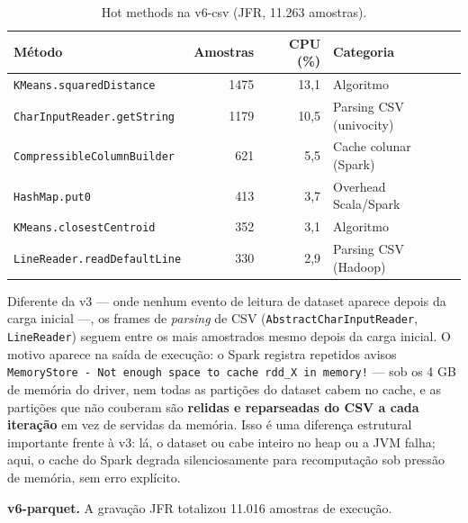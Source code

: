 \begin{table}[H]
\centering
\small
\begin{tabular}{p{7.4cm}rrp{3cm}}
\hline
\textbf{Método} & \textbf{Amostras} & \textbf{CPU (\%)} & \textbf{Categoria} \\
\hline
\texttt{KMeans.squaredDistance}       & 1475 & 13{,}1 & Algoritmo \\
\texttt{CharInputReader.getString}    & 1179 & 10{,}5 & Parsing CSV (univocity) \\
\texttt{CompressibleColumnBuilder}    &  621 &  5{,}5 & Cache colunar (Spark) \\
\texttt{HashMap.put0}                 &  413 &  3{,}7 & Overhead Scala/Spark \\
\texttt{KMeans.closestCentroid}       &  352 &  3{,}1 & Algoritmo \\
\texttt{LineReader.readDefaultLine}   &  330 &  2{,}9 & Parsing CSV (Hadoop) \\
\hline
\end{tabular}
\caption{Hot methods na v6-csv (JFR, 11.263 amostras).}
\label{tab:jfr-hot-v6-csv}
\end{table}

Diferente da v3 --- onde nenhum evento de leitura de dataset aparece
depois da carga inicial ---, os frames de \textit{parsing} de CSV
(\texttt{AbstractCharInputReader}, \texttt{LineReader}) seguem entre os
mais amostrados mesmo depois da carga inicial. O motivo aparece na saída
de execução: o Spark registra repetidos avisos
\texttt{MemoryStore - Not enough space to cache rdd\_X in memory!} ---
sob os 4 GB de memória do driver, nem todas as partições do dataset
cabem no cache, e as partições que não couberam são \textbf{relidas e
reparseadas do CSV a cada iteração} em vez de servidas da memória. Isso
é uma diferença estrutural importante frente à v3: lá, o dataset ou cabe
inteiro no heap ou a JVM falha; aqui, o cache do Spark degrada
silenciosamente para recomputação sob pressão de memória, sem erro
explícito.

\textbf{v6-parquet.} A gravação JFR totalizou 11.016 amostras de execução.

